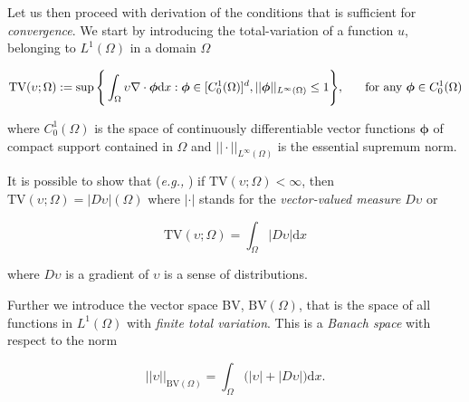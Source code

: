 Let us then proceed with derivation of the conditions that is sufficient for \textit{convergence}. 
We start by introducing the total-variation of a function $u$, belonging to $L^1(\Omega)$ in a domain $\Omega$

\begin{equation}
\text{TV}(\upsilon;\Omega):=\sup\Bigg\{ \int_{\Omega} \upsilon\nabla\cdot\boldsymbol{\phi}\text{d}x: \boldsymbol{\phi}\in [C_0 ^1 (\Omega)]^d, ||\boldsymbol{\phi}||_{L^{\infty}(\Omega)}\leq 1 \Bigg\}, \hspace{5mm} \text{ for any }\boldsymbol{\phi} \in C_0 ^1 (\Omega)
\end{equation}

where $C_0 ^1(\Omega)$ is the space of continuously differentiable vector functions $\boldsymbol{\phi}$ of compact support contained in $\Omega$ and $||\cdot||_{L^{\infty}(\Omega)}$ is the essential supremum norm. 

It is possible to show that (\textit{e.g.,} \cite{Luigi:2002}) if $\text{TV}(\upsilon ; \Omega) < \infty$, then $\text{TV}(\upsilon ; \Omega) = |D\upsilon|(\Omega)$ where $|\cdot|$ stands for the \textit{vector-valued measure} $D\upsilon$ or 

\begin{equation}
\text{TV}(\upsilon; \Omega) = \int_{\Omega}|D\upsilon|\text{d}x
\end{equation}

where $D\upsilon$ is a gradient of $\upsilon$ is a sense of distributions. 

Further we introduce the vector space BV, $\text{BV}(\Omega)$, that is the space of all functions in $L^1(\Omega)$ with \textit{finite total variation}. This is a \textit{Banach space} with respect to the norm 

\begin{equation}
|| \upsilon ||_{\text{BV}(\Omega)} = \int_{\Omega}\big(|\upsilon| + |D\upsilon|\big)\text{d}x.
\end{equation}

